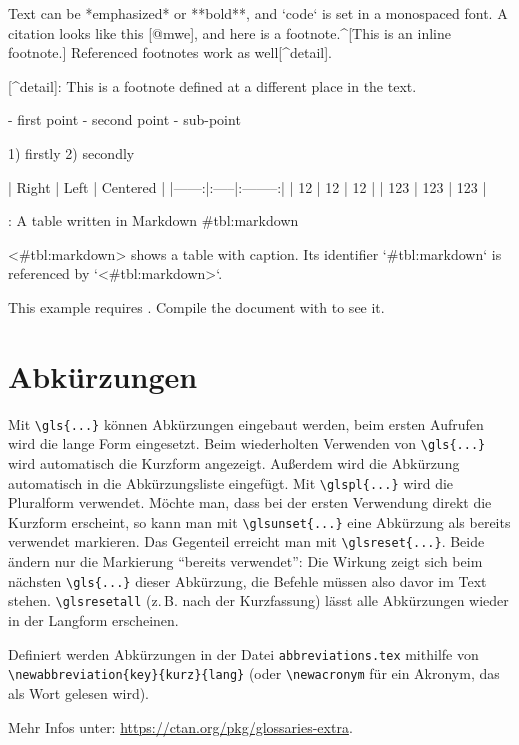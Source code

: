 \documentclass[../main-german]{subfiles}
\begin{document}
  \begin{ltgexample}
  \begin{markdown}
Text can be *emphasized* or **bold**, and `code` is set in a monospaced font.
A citation looks like this [@mwe], and here is a footnote.^[This is an inline footnote.]
Referenced footnotes work as well[^detail].

[^detail]: This is a footnote defined at a different place in the text.

- first point
- second point
  - sub-point

1) firstly
2) secondly

| Right | Left | Centered |
|------:|:-----|:--------:|
|    12 | 12   |    12    |
|   123 | 123  |   123    |

: A table written in Markdown {#tbl:markdown}

<#tbl:markdown> shows a table with caption.
Its identifier `{#tbl:markdown}` is referenced by `<#tbl:markdown>`.
\end{markdown}
  \end{ltgexample}
\else
  This example requires .
  Compile the document with  to see it.
\fi

\section{Abkürzungen}

Mit \verb+\gls{...}+ können Abkürzungen eingebaut werden, beim ersten Aufrufen wird die lange Form eingesetzt.
Beim wiederholten Verwenden von \verb+\gls{...}+ wird automatisch die Kurzform angezeigt.
Außerdem wird die Abkürzung automatisch in die Abkürzungsliste eingefügt.
Mit \verb+\glspl{...}+ wird die Pluralform verwendet.
Möchte man, dass bei der ersten Verwendung direkt die Kurzform erscheint, so kann man mit \verb+\glsunset{...}+ eine Abkürzung als bereits verwendet markieren.
Das Gegenteil erreicht man mit \verb+\glsreset{...}+.
Beide ändern nur die Markierung \enquote{bereits verwendet}: Die Wirkung zeigt sich beim nächsten \verb+\gls{...}+ dieser Abkürzung, die Befehle müssen also davor im Text stehen.
\verb+\glsresetall+ (z.\,B. nach der Kurzfassung) lässt alle Abkürzungen wieder in der Langform erscheinen.

Definiert werden Abkürzungen in der Datei \verb+abbreviations.tex+ mithilfe von \verb+\newabbreviation{key}{kurz}{lang}+ (oder \verb+\newacronym+ für ein Akronym, das als Wort gelesen wird).

Mehr Infos unter: \url{https://ctan.org/pkg/glossaries-extra}.
\end{document}
